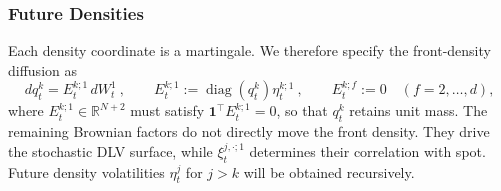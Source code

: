 \documentclass[11pt]{article}
\newcommand{\one}{\mathbf 1}
\theoremstyle{plain}
\theoremstyle{definition}
\theoremstyle{remark}
\begin{document}
      \subsubsection{Future Densities}
  \label{sec:future-densities}

       Each density coordinate
      is a martingale. We therefore specify the front-density diffusion as
      \[
        dq_t^k=E_t^{k;1}\,dW_t^1 \ ,
        \qquad
        E_t^{k;1}:=\operatorname{diag}(q_t^k)\eta_t^{k;1} \ ,
        \qquad E_t^{k;f}:=0\quad(f=2,\ldots,d),
      \]
      where $E_t^{k;1}\in\mathbb R^{N+2}$ must satisfy
      $\one^{\!\top}E_t^{k;1}=0$, so that $q_t^k$ retains unit mass. The
      remaining Brownian factors do not directly move the front density. They
      drive the stochastic DLV surface, while $\xi_t^{j,\cdot;1}$ determines their correlation with spot.
      Future density volatilities $\eta_t^j$ for $j>k$ will be obtained recursively.
\end{document}
